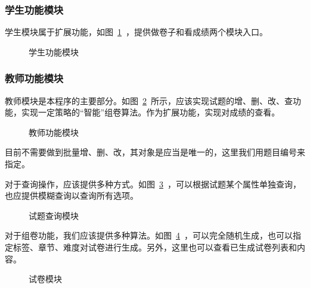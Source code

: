 \subsubsection{学生功能模块}

学生模块属于扩展功能，如图~\ref{al_student}~，提供做卷子和看成绩两个模块入口。

\begin{figure}[htp]
\pictext
{}
\caption{\label{al_student}学生功能模块}  
\end{figure}

\subsubsection{教师功能模块}

教师模块是本程序的主要部分。如图~\ref{al_teacher}~所示，应该实现试题的增、删、改、查功能，实现一定策略的“智能”组卷算法。作为扩展功能，实现对成绩的查看。

\begin{figure}[htp]
\pictext
{}
\caption{\label{al_teacher}教师功能模块}  
\end{figure}

目前不需要做到批量增、删、改，其对象是应当是唯一的，这里我们用题目编号来指定。

对于查询操作，应该提供多种方式。如图~\ref{al_select}~，可以根据试题某个属性单独查询，也应提供模糊查询以查询所有选项。

\begin{figure}[htp]
\pictext
{}
\caption{\label{al_select}试题查询模块}  
\end{figure}

对于组卷功能，我们应该提供多种算法。如图~\ref{al_generate}~，可以完全随机生成，也可以指定标签、章节、难度对试卷进行生成。另外，这里也可以查看已生成试卷列表和内容。

\begin{figure}[htp]
\pictext
{}
\caption{\label{al_generate}试卷模块}  
\end{figure}
